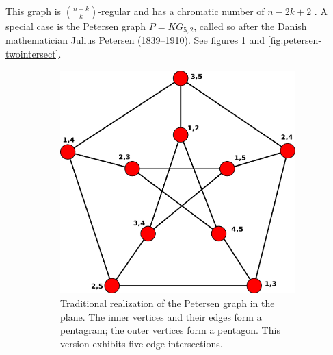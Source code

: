 \documentclass[11pt,            %
               a4paper,         %
               oneside,         %
               DIV12,           %
               fleqn,           %
               halfparskip,     %
               nochapterprefix, %
               bibtotocnumbered,%
              ]{scrartcl} %
\theoremstyle{definition}
\begin{document}
This graph is ${n-k}\choose k$-regular and has a chromatic number of
$n - 2k + 2$ \cite{kneser}. A special case is the Petersen graph $P =
KG_{5,2}$, called so after the Danish mathematician Julius Petersen
(1839--1910). See figures \ref{fig:petersen} and
\ref{fig:petersen-twointersect}.

\begin{figure}[h]
  \begin{subfigure}[t]{.45\textwidth}
    \centering
    \includegraphics[keepaspectratio=true,width=\textwidth]{../planar-graphs/petersen-grundlage.pdf}
    \caption{Traditional realization of the Petersen graph in the plane.
      The inner vertices and their edges form a pentagram; the outer
      vertices form a pentagon. This version exhibits five edge
      intersections.}
    \label{fig:petersen}
  \end{subfigure}\hfill
  \begin{subfigure}[t]{.45\textwidth}
    \centering

\end{subfigure}
\end{figure}
\end{document}
